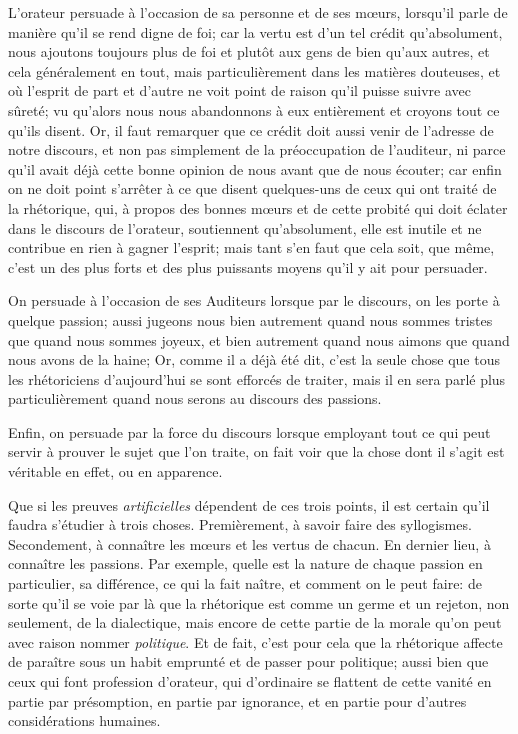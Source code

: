 \bigbreak

L'orateur persuade à l'occasion de sa personne et de ses mœurs, lorsqu'il parle de manière qu'il se rend digne de foi; car la vertu est d'un tel crédit
qu'absolument, nous ajoutons toujours plus de foi et plutôt aux gens de bien qu'aux autres, et cela généralement en tout, mais particulièrement dans les
matières douteuses, et où l'esprit de part et d'autre ne voit point de raison qu'il puisse suivre avec sûreté; vu qu'alors nous nous abandonnons à eux
entièrement et croyons tout ce qu'ils disent. Or, il faut remarquer que ce crédit doit aussi venir de l'adresse de notre discours, et non pas simplement
de la préoccupation de l'auditeur, ni parce qu'il avait déjà cette bonne opinion de nous avant que de nous écouter; car enfin on ne doit point s'arrêter
à ce que disent quelques-uns de ceux qui ont traité de la rhétorique, qui, à propos des bonnes mœurs et de cette probité qui doit éclater dans le discours
de l'orateur, soutiennent qu'absolument, elle est inutile et ne contribue en rien à gagner l'esprit; mais tant s'en faut que cela soit, que même, c'est un
des plus forts et des plus puissants moyens qu'il y ait pour persuader.

On persuade à l'occasion de ses Auditeurs lorsque par le discours, on les porte à quelque passion; aussi jugeons nous bien autrement quand nous sommes
tristes que quand nous sommes joyeux, et bien autrement quand nous aimons que quand nous avons de la haine; Or, comme il a déjà été dit, c'est la seule
chose que tous les rhétoriciens d'aujourd'hui se sont efforcés de traiter, mais il en sera parlé plus particulièrement quand nous serons au discours des
passions. 

Enfin, on persuade par la force du discours lorsque employant tout ce qui peut servir à prouver le sujet que l'on traite, on fait voir que la chose dont
il s'agit est véritable en effet, ou en apparence.

\bigbreak

Que si les preuves \emph{artificielles} dépendent de ces trois points, il est certain qu'il faudra s'étudier à trois choses. Premièrement, à savoir faire
des syllogismes. Secondement, à connaître les mœurs et les vertus de chacun. En dernier lieu, à connaître les passions. Par exemple, quelle est la nature
de chaque passion en particulier, sa différence, ce qui la fait naître, et comment on le peut faire: de sorte qu'il se voie par là que la rhétorique est
comme un germe et un rejeton, non seulement, de la dialectique, mais encore de cette partie de la morale qu'on peut avec raison nommer \emph{politique}. Et
de fait, c'est pour cela que la rhétorique affecte de paraître sous un habit emprunté et de passer pour politique; aussi bien que ceux qui font profession
d'orateur, qui d'ordinaire se flattent de cette vanité en partie par présomption, en partie par ignorance, et en partie pour d'autres considérations
humaines.

